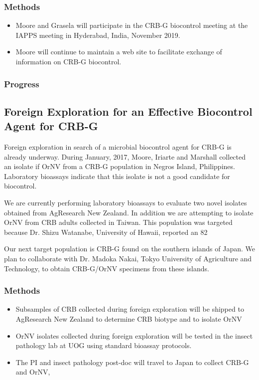 \documentclass[12pt,letterpaper,english,bibliography=totocnumbered,abstract=on]{scrartcl}
\begin{document}
\subsubsection{Methods}

\begin{itemize}
    \item Moore and Grasela will participate in the CRB-G biocontrol meeting at the IAPPS meeting in Hyderabad, India, November 2019.
    \item Moore will continue to maintain a web site to facilitate exchange of information on CRB-G biocontrol.
\end{itemize}

\subsubsection{Progress}


\subsection{Foreign Exploration for an Effective Biocontrol Agent for CRB-G}

Foreign exploration in search of a microbial biocontrol agent for CRB-G is already underway. During January, 2017, Moore, Iriarte and Marshall collected an isolate if OrNV from a CRB-G population in Negros Island, Philippines. Laboratory bioassays indicate that this isolate is not a good candidate for biocontrol.

We are currently performing laboratory bioassays to evaluate two novel isolates obtained from AgResearch New Zealand. In addition we are attempting to isolate OrNV from CRB adults collected in Taiwan. This population was targeted because Dr. Shizu Watanabe, University of Hawaii, reported an 82%

Our next target population is CRB-G found on the southern islands of Japan. We plan to collaborate with Dr. Madoka Nakai, Tokyo University of Agriculture and Technology, to obtain CRB-G/OrNV specimens from these islands.

\subsubsection{Methods}

\begin{itemize}
	\item Subsamples of CRB collected during foreign exploration will be shipped to AgResearch New Zealand to determine CRB biotype and to isolate OrNV
	\item OrNV isolates collected during foreign exploration will be tested in the insect pathology lab at UOG using standard bioassay protocols.
	\item The PI and insect pathology post-doc will travel to Japan to collect CRB-G and OrNV, 
\end{itemize}
\end{document}
